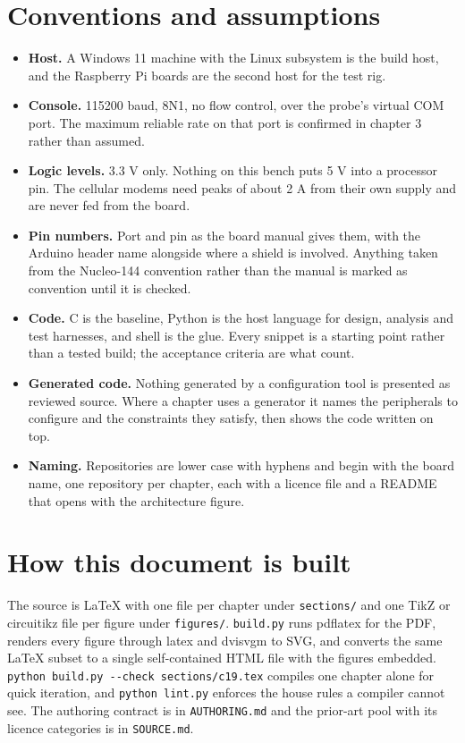 \section*{Conventions and assumptions}

\begin{itemize}
\item \textbf{Host.} A Windows 11 machine with the Linux subsystem is the build host, and the Raspberry Pi boards are the second host for the test rig.
\item \textbf{Console.} 115200 baud, 8N1, no flow control, over the probe's virtual COM port. The maximum reliable rate on that port is confirmed in chapter 3 rather than assumed.
\item \textbf{Logic levels.} 3.3 V only. Nothing on this bench puts 5 V into a processor pin. The cellular modems need peaks of about 2 A from their own supply and are never fed from the board.
\item \textbf{Pin numbers.} Port and pin as the board manual gives them, with the Arduino header name alongside where a shield is involved. Anything taken from the Nucleo-144 convention rather than the manual is marked as convention until it is checked.
\item \textbf{Code.} C is the baseline, Python is the host language for design, analysis and test harnesses, and shell is the glue. Every snippet is a starting point rather than a tested build; the acceptance criteria are what count.
\item \textbf{Generated code.} Nothing generated by a configuration tool is presented as reviewed source. Where a chapter uses a generator it names the peripherals to configure and the constraints they satisfy, then shows the code written on top.
\item \textbf{Naming.} Repositories are lower case with hyphens and begin with the board name, one repository per chapter, each with a licence file and a README that opens with the architecture figure.
\end{itemize}

\section*{How this document is built}

The source is LaTeX with one file per chapter under \texttt{sections/} and one TikZ or circuitikz file per figure under \texttt{figures/}. \texttt{build.py} runs pdflatex for the PDF, renders every figure through latex and dvisvgm to SVG, and converts the same LaTeX subset to a single self-contained HTML file with the figures embedded. \texttt{python build.py -\/-check sections/c19.tex} compiles one chapter alone for quick iteration, and \texttt{python lint.py} enforces the house rules a compiler cannot see. The authoring contract is in \texttt{AUTHORING.md} and the prior-art pool with its licence categories is in \texttt{SOURCE.md}.
